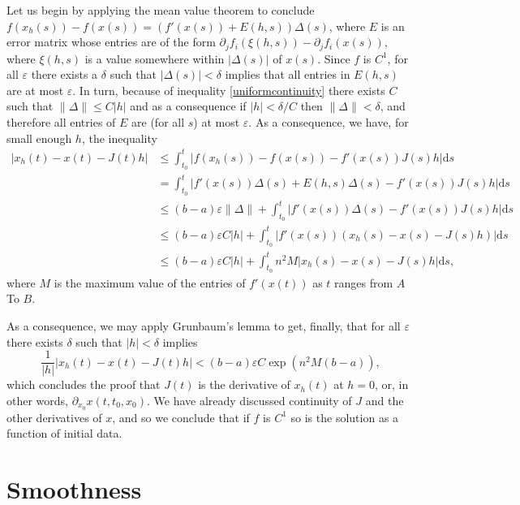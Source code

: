 \documentclass{article}
\newcommand{\dd}{\mathrm{d}}
\begin{document}
Let us begin by applying the mean value theorem to conclude $f(x_h(s)) - f(x(s)) = (f'(x(s)) + E(h,s)) \Delta(s)$, where $E$ is an error matrix whose entries are of the form $\partial_j f_i(\xi(h,s)) - \partial_j f_i(x(s))$, where $\xi(h,s)$ is a value somewhere within $\lvert \Delta(s) \rvert$ of $x(s)$. Since $f$ is $C^1$, for all $\varepsilon$ there exists a $\delta$ such that $\lvert \Delta(s) \rvert < \delta$ implies that all entries in $E(h,s)$ are at most $\varepsilon$. In turn, because of inequality \eqref{uniformcontinuity} there exists $C$ such that $\lVert \Delta \rVert \leq C \lvert h \rvert$ and as a consequence if $\lvert h \rvert < \delta/C$ then $\lVert \Delta \rVert < \delta$, and therefore all entries of $E$ are (for all $s$) at most $\varepsilon$. As a consequence, we have, for small enough $h$, the inequality
\begin{align*}
\left\lvert x_h(t) - x(t) - J(t) h \right\rvert &\leq \int_{t_0}^t \lvert f(x_h(s)) - f(x(s)) - f'(x(s)) J(s) h \rvert \dd s\\
&= \int_{t_0}^t \lvert f'(x(s)) \Delta(s) + E(h,s) \Delta(s) - f'(x(s)) J(s) h \rvert \dd s\\
&\leq (b-a) \varepsilon \lVert \Delta \rVert + \int_{t_0}^t \lvert f'(x(s)) \Delta(s) - f'(x(s)) J(s) h \rvert \dd s\\
&\leq (b-a) \varepsilon C \lvert h \rvert + \int_{t_0}^t \lvert f'(x(s)) (x_h(s) - x(s) - J(s) h) \rvert \dd s\\
&\leq (b-a) \varepsilon C \lvert h \rvert + \int_{t_0}^t n^2 M \lvert x_h(s) - x(s) - J(s) h \rvert \dd s,
\end{align*}
where $M$ is the maximum value of the entries of $f'(x(t))$ as $t$ ranges from $A$ To $B$.

As a consequence, we may apply Grunbaum's lemma to get, finally, that for all $\varepsilon$ there exists $\delta$ such that $\lvert h \rvert < \delta$ implies
\[ \frac1{\lvert h \rvert} \lvert x_h(t) - x(t) - J(t) h \rvert < (b-a)\varepsilon C \exp(n^2 M (b-a)),\]
which concludes the proof that $J(t)$ is the derivative of $x_h(t)$ at $h=0$, or, in other words, $\partial_{x_0} x(t,t_0,x_0)$. We have already discussed continuity of $J$ and the other derivatives of $x$, and so we conclude that if $f$ is $C^1$ so is the solution as a function of initial data.

\section{Smoothness}
\end{document}
